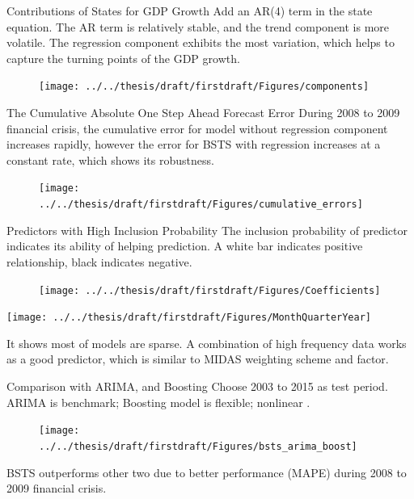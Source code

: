 \documentclass[14pt,xcolor=dvipsnames]{beamer}
\begin{document}
\begin{frame}{Contributions of States for GDP Growth}
Add an AR(4) term in the state equation. The AR term is relatively stable, and the trend component is more volatile. The regression component exhibits the most variation, which  helps to capture the turning points  of the GDP growth. 
\begin{figure}
\centering
\texttt{[image: ../../thesis/draft/firstdraft/Figures/components]}
\label{fig:components}
\end{figure}
\end{frame}
	
\begin{frame}{The Cumulative Absolute One Step Ahead Forecast Error}
During 2008 to 2009 financial crisis, the cumulative error for model without regression component increases rapidly, however the error for BSTS with regression increases at a constant rate, which shows its robustness. 
	\begin{figure}
		\centering
		\texttt{[image: ../../thesis/draft/firstdraft/Figures/cumulative\_errors]}
		\label{fig:cumulative_errors}
	\end{figure}
 	
	
\end{frame}
	
	
\begin{frame}{Predictors with High Inclusion Probability}
The inclusion probability of predictor indicates its ability of helping prediction. A white bar indicates positive relationship,  black indicates  negative. 

\begin{minipage}{0.5\textwidth}
	\begin{figure}[H]
\texttt{[image: ../../thesis/draft/firstdraft/Figures/Coefficients]}
	\end{figure}
\end{minipage} \hfill
\begin{minipage}{0.46\textwidth}
\texttt{[image: ../../thesis/draft/firstdraft/Figures/MonthQuarterYear]}
\end{minipage}
It shows most of models are sparse. A combination of high frequency data works as a good predictor, which is similar to MIDAS weighting scheme and factor. 	
\end{frame}




\begin{frame}{Comparison with ARIMA, and Boosting}
Choose 2003 to 2015 as test period. ARIMA is benchmark; Boosting model is flexible; nonlinear . 
\begin{figure}
\centering
\texttt{[image: ../../thesis/draft/firstdraft/Figures/bsts\_arima\_boost]}
\label{fig:bsts_arima_boost}
\end{figure}
BSTS outperforms other two due to better performance (MAPE) during 2008 to 2009 financial crisis. 

	
\end{frame}
\end{document}
